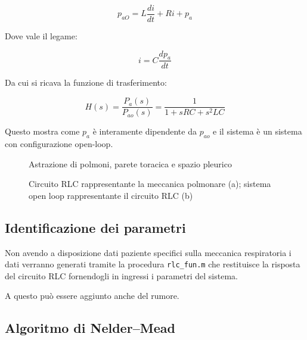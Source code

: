 \begin{equation}
p_{a O}=L \frac{d i}{d t}+R i+p_{a}
\end{equation}

Dove vale il legame:

\begin{equation}
	i=C \frac{d p_{a}}{d t}
\end{equation}

Da cui si ricava la funzione di trasferimento:

\begin{equation}
	H(s)=\frac{P_{a}(s)}{P_{ao}(s)}=\frac{1}{1+s R C+s^{2} L C}
\end{equation}

Questo mostra come $p_a$ è interamente dipendente da $p_{ao}$ e il sistema è un sistema con configurazione open-loop. 

\begin{figure}[b!]
	\centering
	\small{
	\def\svgwidth{0.8\linewidth}
	}
	\caption{Astrazione di polmoni, parete toracica e spazio pleurico}
	\label{fig:model}
\end{figure}

\begin{figure*}[t]
	\begin{subfigure}{0.5\linewidth}
		\centering
		 	\small{\def\svgwidth{0.85\linewidth}
	}
	\caption{}
	\end{subfigure}\hfill
	\begin{subfigure}{0.5\linewidth}
		\centering
	\def\svgwidth{0.8\linewidth}
	
	\caption{}
\end{subfigure}
\caption{Circuito RLC rappresentante la meccanica polmonare (a); sistema open loop rappresentante il circuito RLC (b)}
\label{fig:RLC}
\end{figure*}

\subsection{Identificazione dei parametri}

Non avendo a disposizione dati paziente specifici sulla meccanica respiratoria i dati verranno generati tramite la procedura \texttt{rlc\_fun.m} che restituisce la risposta del circuito RLC fornendogli in ingressi i parametri del sistema. 

A questo può essere aggiunto anche del rumore.

\subsection{Algoritmo di Nelder–Mead}

